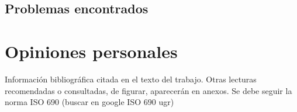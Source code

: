 \documentclass[12pt,a4paper,onecolumn,oneside]{report}
\begin{document}
\subsection*{Problemas encontrados}



\section*{Opiniones personales}




\renewcommand\bibname{Lista de referencias}

Información bibliográfica citada en el texto del trabajo. Otras lecturas recomendadas o consultadas, de figurar, aparecerán en anexos.
Se debe seguir la norma ISO 690 (buscar en google ISO 690 ugr)
\end{document}
